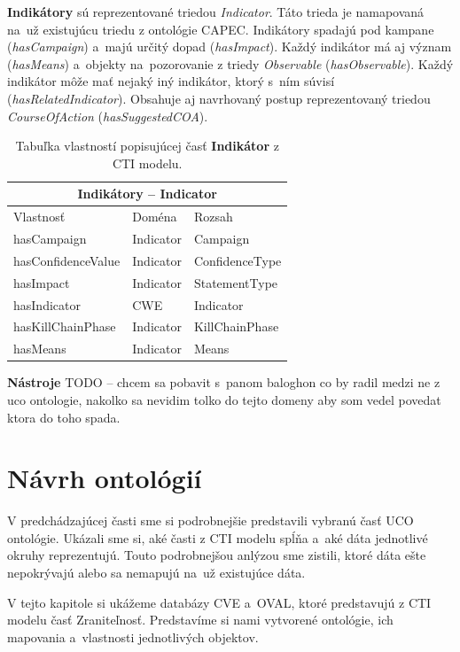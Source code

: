 \documentclass[12pt, a4paper, oneside]{book}
\begin{document}
\textbf{Indikátory} sú reprezentované triedou \textit{Indicator}. Táto trieda je namapovaná na~už existujúcu triedu z ontológie CAPEC. Indikátory spadajú pod kampane (\textit{hasCampaign}) a~majú určitý dopad (\textit{hasImpact}). Každý indikátor má aj význam (\textit{hasMeans}) a~objekty na~pozorovanie z triedy \textit{Observable} (\textit{hasObservable}). Každý indikátor môže mať nejaký iný indikátor, ktorý s~ním súvisí (\textit{hasRelatedIndicator}). Obsahuje aj navrhovaný postup reprezentovaný triedou \textit{CourseOfAction} (\textit{hasSuggestedCOA}).
\begin{table}[hbt!]
\centering
\begin{tabular}{ |p{5cm}||p{3cm}|p{3cm}|  }
 \hline
 \multicolumn{3}{|c|}{Indikátory -- Indicator} \\
 \hline
 Vlastnosť & Doména & Rozsah\\
 \hline
 hasCampaign & Indicator & Campaign\\
 hasConfidenceValue & Indicator & ConfidenceType\\
 hasImpact & Indicator & StatementType\\
 hasIndicator & CWE & Indicator\\
 hasKillChainPhase & Indicator & KillChainPhase\\
 hasMeans & Indicator & Means\\
 \hline
\end{tabular}
\caption{Tabuľka vlastností popisujúcej časť \textbf{Indikátor} z CTI modelu.}
\label{tab:template}
\end{table}


\textbf{Nástroje}
TODO -- chcem sa pobavit s~panom baloghon co by radil medzi ne z uco ontologie, nakolko sa nevidim tolko do tejto domeny aby som vedel povedat ktora do toho spada.


\chapter{Návrh ontológií}
V predchádzajúcej časti sme si podrobnejšie predstavili vybranú časť UCO ontológie. Ukázali sme si, aké časti z CTI modelu spĺňa a~aké dáta jednotlivé okruhy reprezentujú. Touto podrobnejšou anlýzou sme zistili, ktoré dáta ešte nepokrývajú alebo sa nemapujú na~už existujúce dáta. 


V tejto kapitole si ukážeme databázy CVE a~OVAL, ktoré predstavujú z CTI modelu časť Zraniteľnosť. Predstavíme si nami vytvorené ontológie, ich mapovania a~vlastnosti jednotlivých objektov.
\end{document}
